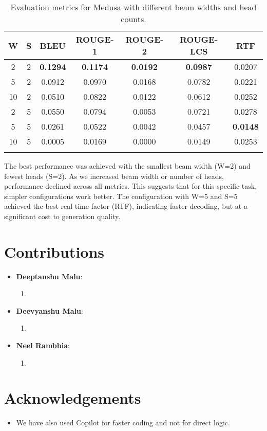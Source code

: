 \documentclass[11pt]{article}
\begin{document}
\begin{longtable}{|c|c|c|c|c|c|c|}
    \hline
    \textbf{W} & \textbf{S} & \textbf{BLEU} & \textbf{ROUGE-1} & \textbf{ROUGE-2} & \textbf{ROUGE-LCS} & \textbf{RTF} \\
    \hline
    2 & 2 & \textbf{0.1294} & \textbf{0.1174} & \textbf{0.0192} & \textbf{0.0987} & 0.0207 \\
    \hline
    5 & 2 & 0.0912 & 0.0970 & 0.0168 & 0.0782 & 0.0221 \\
    \hline
    10 & 2 & 0.0510 & 0.0822 & 0.0122 & 0.0612 & 0.0252 \\
    \hline
    2 & 5 & 0.0550 & 0.0794 & 0.0053 & 0.0721 & 0.0278 \\
    \hline
    5 & 5 & 0.0261 & 0.0522 & 0.0042 & 0.0457 & \textbf{0.0148} \\
    \hline
    10 & 5 & 0.0005 & 0.0169 & 0.0000 & 0.0149 & 0.0253 \\
    \hline
    \caption{Evaluation metrics for Medusa with different beam widths and head counts.}
\end{longtable}

The best performance was achieved with the smallest beam width (W=2) and fewest heads (S=2). As we increased beam width or number of heads, performance declined across all metrics. This suggests that for this specific task, simpler configurations work better. The configuration with W=5 and S=5 achieved the best real-time factor (RTF), indicating faster decoding, but at a significant cost to generation quality.

\section*{Contributions}

\begin{itemize}
    \item \textbf{Deeptanshu Malu}:
    \begin{enumerate}
        \item 
    \end{enumerate}

    \item \textbf{Deevyanshu Malu}:
    \begin{enumerate}
        \item 
    \end{enumerate}

    \item \textbf{Neel Rambhia}:
    \begin{enumerate}
        \item 
    \end{enumerate}
\end{itemize}

\section*{Acknowledgements}

\begin{itemize}
    \item We have also used Copilot for faster coding and not for direct logic.
\end{itemize}
\end{document}
